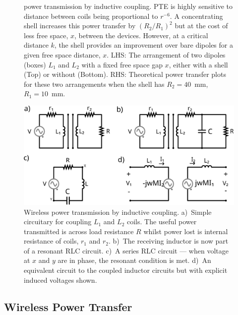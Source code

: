 \documentclass[11pt]{iopart}
\begin{document}
\begin{figure}
{    power transmission by inductive coupling. PTE is highly sensitive
    to distance between coils being proportional to $r^{-6}$. A
    concentrating shell increases this power transfer by $(R_2/R_1)^2$
    but at the cost of less free space, $x$, between the
    devices. However, at a critical distance $k$, the shell provides
    an improvement over bare dipoles for a given free space distance,
    $x$. LHS: The arrangement of two dipoles (boxes) $L_1$ and $L_2$
    with a fixed free space gap $x$, either with a shell (Top) or
    without (Bottom). RHS: Theoretical power transfer plots for these
    two arrangements when the shell has $R_2 = 40$~mm, $R_1 =
    10$~mm.}\label{fig:d_motiv}
\end{figure}

\begin{figure}
  \begin{center}
   \noindent\includegraphics[width=0.65\linewidth]{images/WPT.pdf}
  \end{center}
  \caption{Wireless power transmission by inductive
    coupling. a)~Simple circuitary for coupling $L_1$ and $L_2$
    coils. The useful power transmitted is across load resistance $R$
    whilst power lost is internal resistance of coils, $r_1$ and
    $r_2$. b)~The receiving inductor is now part of a resonant RLC
    circuit. c)~A series RLC circuit --- when voltage at $x$ and $y$
    are in phase, the resonant condition is met. d)~An equivalent
    circuit to the coupled inductor circuits but with explicit induced
    voltages shown. }\label{fig:WPT}
\end{figure}

\subsection{Wireless Power Transfer}
\end{document}
